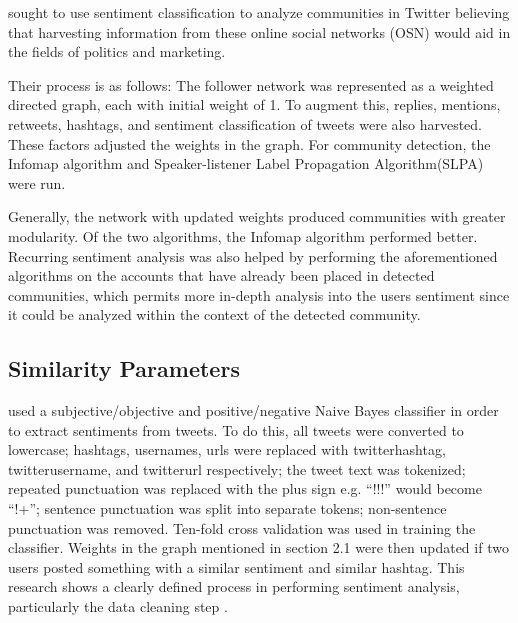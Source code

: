  sought to use sentiment classification to analyze communities in Twitter believing that harvesting information from these online social networks (OSN) would aid in the fields of politics and marketing. 


Their process is as follows: The follower network was represented as a weighted directed graph, each with initial weight of 1. To augment this, replies, mentions, retweets, hashtags, and sentiment classification of tweets were also harvested. These factors adjusted the weights in the graph. For community detection, the Infomap algorithm and Speaker-listener Label Propagation Algorithm(SLPA) were run. 


Generally, the network with updated weights produced communities with greater modularity. Of the two algorithms, the Infomap algorithm performed better. Recurring sentiment analysis was also helped by performing the aforementioned algorithms on the accounts that have already been placed in detected communities, which permits more in-depth analysis into the user\vtick s sentiment since it could be analyzed within the context of the detected community.


\subsection{Similarity Parameters}


 used a subjective/objective and positive/negative Naive Bayes classifier in order to extract sentiments from tweets. To do this, all tweets were converted to lowercase; hashtags, usernames, urls were replaced with twitterhashtag, twitterusername, and twitterurl respectively; the tweet text was tokenized; repeated punctuation was replaced with the plus sign e.g. ``!!!'' would become ``!+''; sentence punctuation was split into separate tokens; non-sentence punctuation was removed. Ten-fold cross validation was used in training the classifier. Weights in the graph mentioned in section 2.1 were then updated if two users posted something with a similar sentiment and similar hashtag. This research shows a clearly defined process in performing sentiment analysis, particularly the data cleaning step \cite{Deitrick:2013}.


